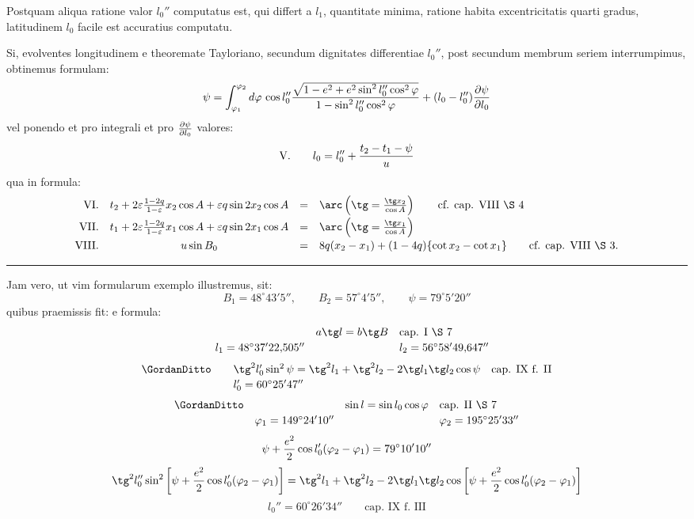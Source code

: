 \begingroup\small
Postquam aliqua ratione valor $l_0''$ computatus est, qui differt a $l_1$, quantitate minima, ratione habita excentricitatis quarti gradus, latitudinem $l_0$ facile est accuratius computatu.

Si, evolventes longitudinem e theoremate Tayloriano, secundum dignitates differentiae $l_0''$, post secundum membrum seriem interrumpimus, obtinemus formulam:
\[
 \psi=\int_{\varphi_1}^{\varphi_2}d\varphi\,\cos l_0''{\sqrt{1-e^2+e^2\sin^2l_0''\cos^2\varphi}\over1-\sin^2l_0''\cos^2\varphi}
 +(l_0-l_0''){\partial\psi\over\partial l_0}
\]
vel ponendo et pro integrali et pro ${\partial\psi\over\partial l_0}$ valores:
\[
\text{V.}\qquad l_0=l_0''+{t_2-t_1-\psi\over u}
\]
qua in formula:
\[
\begin{array}{rcll}
\text{VI.}& t_2+2\varepsilon{1-2q\over1-\varepsilon}x_2\cos A+\varepsilon q\sin2x_2\cos A
&=&\arc\left(\tg={\tg x_2\over\cos A}\right) \qquad \text{cf. cap. VIII \S\ 4}\vspace{0.2em}\\
\text{VII.}& t_1+2\varepsilon{1-2q\over1-\varepsilon}x_1\cos A+\varepsilon q\sin2x_1\cos A
&=&\arc\left(\tg={\tg x_1\over\cos A}\right)\vspace{0.2em}\\
\text{VIII.}& u\sin B_0&=&8q(x_2-x_1)+(1-4q)\{\cot x_2-\cot x_1\}\qquad \text{cf. cap. VIII \S\ 3.}
\end{array}
\]

\rule{0.35\textwidth}{0.4pt}

Jam vero, ut vim formularum exemplo illustremus, sit:
\[
 B_1=48^\circ43'5'',\qquad B_2=57^\circ4'5'',\qquad \psi=79^\circ5'20''
\]
quibus praemissis fit:
e formula:
\[
\begin{array}{rcll}
&& a\tg l=b\tg B & \text{cap. I \S\ 7}\vspace{0.2em}\\
& l_1=48^\circ37'22{,}505''&& l_2=56^\circ58'49{,}647''
\end{array}
\]
\[
\begin{array}{rcll}
\GordanDitto&& \tg^2l_0'\sin^2\psi=\tg^2l_1+\tg^2l_2-2\tg l_1\tg l_2\cos\psi &\text{cap. IX f. II}\vspace{0.2em}\\
&& l_0'=60^\circ25'47''&
\end{array}
\]
\[
\begin{array}{rcll}
\GordanDitto&& \sin l=\sin l_0\cos\varphi &\text{cap. II \S\ 7}\vspace{0.2em}\\
& \varphi_1=149^\circ24'10''&& \varphi_2=195^\circ25'33''
\end{array}
\]
\[
 \psi+{e^2\over2}\cos l_0'(\varphi_2-\varphi_1)=79^\circ10'10''
\]
\[
\tg^2l_0''\sin^2\left[\psi+{e^2\over2}\cos l_0'(\varphi_2-\varphi_1)\right]
=\tg^2l_1+\tg^2l_2-2\tg l_1\tg l_2\cos\left[\psi+{e^2\over2}\cos l_0'(\varphi_2-\varphi_1)\right]
\]
\[
 l_0''=60^\circ26'34'' \qquad\text{cap. IX f. III}
\]
\endgroup
